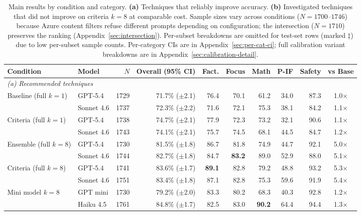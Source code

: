 \documentclass{article}
\begin{document}
\begin{table}[!htbp]
\centering
\caption{Main results by condition and category. \textbf{(a)} Techniques that reliably improve accuracy. \textbf{(b)} Investigated techniques that did not improve on criteria $k{=}8$ at comparable cost. Sample sizes vary across conditions ($N{=}1700$--$1746$) because Azure content filters refuse different prompts depending on configuration; the intersection ($N{=}1710$) preserves the ranking (Appendix~\ref{sec:intersection}). Per-subset breakdowns are omitted for test-set rows (marked $\ddagger$) due to low per-subset sample counts. Per-category CIs are in Appendix~\ref{sec:per-cat-ci}; full calibration variant breakdowns are in Appendix~\ref{sec:calibration-detail}.}
\label{tab:results-main}
\footnotesize
\begin{tabular}{llrrrrrrrc}
\toprule
Condition & Model & $N$ & Overall (95\% CI) & Fact. & Focus & Math & P-IF & Safety & vs Base \\
\midrule
\multicolumn{10}{l}{\textit{(a) Recommended techniques}} \\
\midrule
Baseline (full $k{=}1$)   & GPT-5.4    & 1729 & 71.7\% ($\pm$2.1) & 76.4 & 70.1 & 61.2 & 34.0 & 87.3 & 1.0$\times$ \\
                          & Sonnet 4.6 & 1737 & 72.3\% ($\pm$2.2) & 71.6 & 72.1 & 75.3 & 38.1 & 84.2 & 1.1$\times$ \\
Criteria (full $k{=}1$)   & GPT-5.4    & 1738 & 74.7\% ($\pm$2.1) & 77.9 & 72.3 & 73.2 & 32.1 & 90.6 & 1.1$\times$ \\
                          & Sonnet 4.6 & 1743 & 74.1\% ($\pm$2.1) & 75.7 & 74.5 & 68.1 & 44.5 & 84.7 & 1.2$\times$ \\
Ensemble (full $k{=}8$)   & GPT-5.4    & 1730 & 81.5\% ($\pm$1.8) & 86.7 & 81.8 & 74.9 & 44.7 & 92.1 & 5.0$\times$ \\
                          & Sonnet 4.6 & 1744 & 82.7\% ($\pm$1.8) & 84.7 & \textbf{83.2} & 89.0 & 52.9 & 88.0 & 5.1$\times$ \\
Criteria (full $k{=}8$)   & GPT-5.4    & 1741 & 83.6\% ($\pm$1.7) & \textbf{89.1} & 82.8 & 79.2 & 48.8 & 93.2 & 5.3$\times$ \\
                          & Sonnet 4.6 & 1751 & 83.4\% ($\pm$1.8) & 87.1 & 82.8 & 75.3 & 59.6 & 91.9 & 5.4$\times$ \\
Mini model $k{=}8$        & GPT mini   & 1730 & 79.2\% ($\pm$2.0) & 83.3 & 80.2 & 68.3 & 40.3 & 92.8 & 1.2$\times$ \\
                          & Haiku 4.5  & 1761 & 84.8\% ($\pm$1.7) & 82.5 & 83.0 & \textbf{90.2} & 64.4 & 94.4 & 1.3$\times$ \\

\end{tabular}
\end{table}
\end{document}
